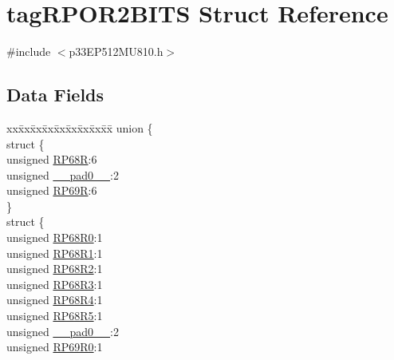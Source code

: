 \hypertarget{structtag_r_p_o_r2_b_i_t_s}{}\section{tag\+R\+P\+O\+R2\+B\+I\+TS Struct Reference}
\label{structtag_r_p_o_r2_b_i_t_s}


{\ttfamily \#include $<$p33\+E\+P512\+M\+U810.\+h$>$}

\subsection*{Data Fields}
\begin{DoxyCompactItemize}
\item 
\begin{tabbing}
xx\=xx\=xx\=xx\=xx\=xx\=xx\=xx\=xx\=\kill
union \{\\
\>struct \{\\
\>\>unsigned \hyperlink{structtag_r_p_o_r2_b_i_t_s_a30847ef6fd85bf0f8220381a0cd7fc75}{RP68R}:6\\
\>\>unsigned \hyperlink{structtag_r_p_o_r2_b_i_t_s_adf71f3d8410c1f1dbbc96680a92c49af}{\_\_pad0\_\_}:2\\
\>\>unsigned \hyperlink{structtag_r_p_o_r2_b_i_t_s_aebe3e536f3914a32846e11bda2ddb015}{RP69R}:6\\
\>\} \\
\>struct \{\\
\>\>unsigned \hyperlink{structtag_r_p_o_r2_b_i_t_s_af18bfbcc1a807054c664c6e830297bc6}{RP68R0}:1\\
\>\>unsigned \hyperlink{structtag_r_p_o_r2_b_i_t_s_a64a2b7cbe7d818f370d0a6dbf3bfdfc2}{RP68R1}:1\\
\>\>unsigned \hyperlink{structtag_r_p_o_r2_b_i_t_s_a662a5af9b421fbbdb68ed796fadddab2}{RP68R2}:1\\
\>\>unsigned \hyperlink{structtag_r_p_o_r2_b_i_t_s_a13d39ef29c9b2058908a2f4ea73e45af}{RP68R3}:1\\
\>\>unsigned \hyperlink{structtag_r_p_o_r2_b_i_t_s_a04221bb3eebc7dd8b05be3b13295cf15}{RP68R4}:1\\
\>\>unsigned \hyperlink{structtag_r_p_o_r2_b_i_t_s_a1044626eeaabe364b855513f5b5b24b4}{RP68R5}:1\\
\>\>unsigned \hyperlink{structtag_r_p_o_r2_b_i_t_s_adf71f3d8410c1f1dbbc96680a92c49af}{\_\_pad0\_\_}:2\\
\>\>unsigned \hyperlink{structtag_r_p_o_r2_b_i_t_s_a0cb9209ce80cb9ecc7048e568d06ac01}{RP69R0}:1\\

\end{tabbing}
\end{DoxyCompactItemize}
